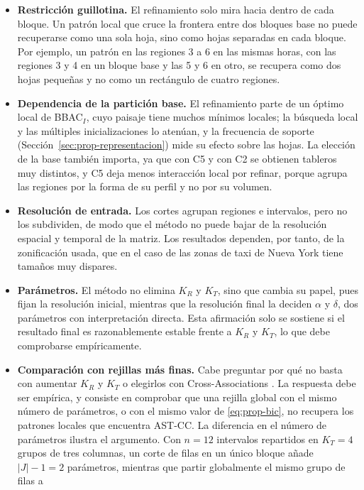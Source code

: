 \begin{itemize}
  \item \textbf{Restricción guillotina.} El refinamiento solo mira hacia
  dentro de cada bloque. Un patrón local que cruce la frontera entre dos
  bloques base no puede recuperarse como una sola hoja, sino como hojas
  separadas en cada bloque. Por ejemplo, un patrón en las regiones 3 a 6 en las
  mismas horas, con las regiones 3 y 4 en un bloque base y las 5 y 6 en otro, se
  recupera como dos hojas pequeñas y no como un rectángulo de cuatro regiones.
  \item \textbf{Dependencia de la partición base.} El refinamiento parte de un
  óptimo local de BBAC$_I$, cuyo paisaje tiene muchos mínimos locales; la
  búsqueda local y las múltiples inicializaciones lo atenúan, y la frecuencia
  de soporte (Sección~\ref{sec:prop-representacion}) mide su efecto sobre las
  hojas. La elección de la base también importa, ya que con C5 y con C2 se obtienen
  tableros muy distintos, y C5 deja menos interacción local por refinar, porque
  agrupa las regiones por la forma de su perfil y no por su volumen.
  \item \textbf{Resolución de entrada.} Los cortes agrupan regiones e
  intervalos, pero no los subdividen, de modo que el método no puede bajar de la resolución
  espacial y temporal de la matriz. Los resultados dependen, por tanto, de la
  zonificación usada, que en el caso de las zonas de taxi de Nueva York tiene
  tamaños muy dispares.
  \item \textbf{Parámetros.} El método no elimina $K_R$ y $K_T$, sino que
  cambia su papel, pues fijan la resolución inicial, mientras que la resolución
  final la deciden $\alpha$ y $\delta$, dos parámetros con interpretación
  directa. Esta afirmación solo se sostiene si el resultado final es
  razonablemente estable frente a $K_R$ y $K_T$, lo que debe comprobarse
  empíricamente.
  \item \textbf{Comparación con rejillas más finas.} Cabe preguntar por qué
  no basta con aumentar $K_R$ y $K_T$ o elegirlos con Cross-Associations
  \cite{Chakrabarti2004}. La respuesta debe ser empírica, y consiste en comprobar que una rejilla global con
  el mismo número de parámetros, o con el mismo valor de \eqref{eq:prop-bic},
  no recupera los patrones locales que encuentra AST-CC. La diferencia en el
  número de parámetros ilustra el argumento. Con $n=12$ intervalos repartidos en
  $K_T=4$ grupos de tres columnas, un corte de filas en un único bloque añade
  $|J|-1=2$ parámetros, mientras que partir globalmente el mismo grupo de filas a

\end{itemize}
